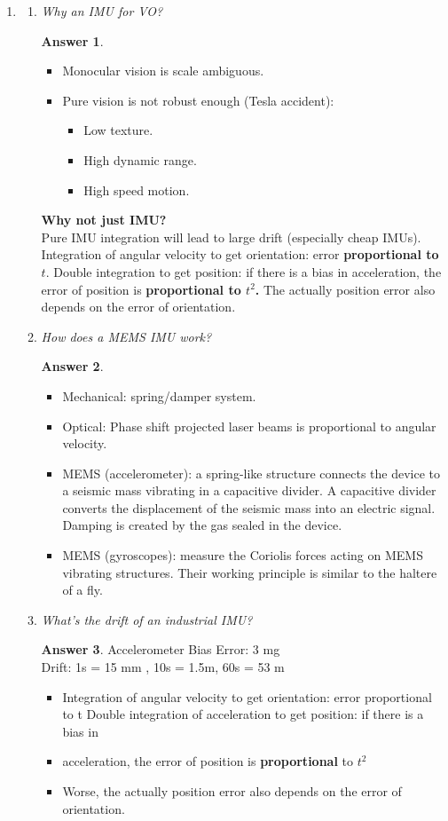 \documentclass[a4paper,12 pt]{article}
\theoremstyle{definition}
\theoremstyle{remark}
\theoremstyle{definition}
\theoremstyle{definition}
\theoremstyle{definition}
\theoremstyle{definition}
\theoremstyle{remark}
\theoremstyle{remark}
\theoremstyle{definition}
\theoremstyle{definition}
\newtheorem*{answer}{Answer}
\begin{document}
\begin{enumerate}
\item
\begin{enumerate}
\item \textit{Why an IMU for VO?}
\begin{answer}
\
\begin{itemize}
\item Monocular vision is scale ambiguous.
\item Pure vision is not robust enough (Tesla accident):
\begin{itemize}
\item Low texture.
\item High dynamic range.
\item High speed motion.
\end{itemize}
\end{itemize}
\textbf{Why not just IMU?}\\
Pure IMU integration will lead to large drift (especially cheap IMUs). Integration of angular velocity to get orientation: error \textbf{proportional to $t$}. Double integration to get position: if there is a bias in acceleration, the error of position is \textbf{proportional to $t^2$.} The actually position error also depends on the error of orientation.
\end{answer}
\item \textit{How does a MEMS IMU work? }
\begin{answer}
\
\begin{itemize}
\item Mechanical: spring/damper system.
\item Optical: Phase shift projected laser beams is proportional to angular velocity.
\item MEMS (accelerometer): a spring-like structure connects the device to a seismic mass vibrating in a capacitive divider. A capacitive divider converts the displacement of the seismic mass into an electric signal. Damping is created by the gas sealed in the device.
\item MEMS (gyroscopes): measure the Coriolis forces acting on MEMS vibrating structures. Their working principle is similar to the haltere of a fly.
\end{itemize}
\end{answer}
\item \textit{What’s the drift of an industrial IMU?}
\begin{answer}
Accelerometer Bias Error: 3 mg\\
Drift: 1s = 15 mm , 10s = 1.5m, 60s = 53 m 
\begin{itemize}
\item Integration of angular velocity to get orientation: error proportional to t Double integration of acceleration to get position: if there is a bias in
\item acceleration, the error of position is \textbf{proportional} to $t^2$
\item Worse, the actually position error also depends on the error of orientation.
\end{itemize}
\end{answer}
\end{enumerate}


\end{enumerate}
\end{document}
